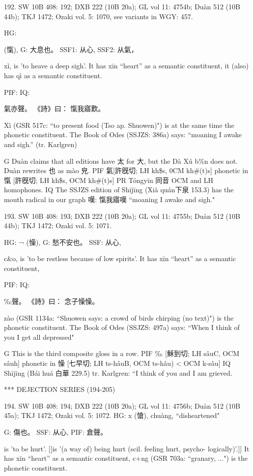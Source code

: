 192. SW 10B 408: 192; DXB 222 (10B 20a); GL vol 11: 4754b; Duàn 512 (10B 44b); TKJ 1472; Ozaki vol. 5: 1070, see
variants in WGY: 457.

HG:	{ (愾),
G:	大息也。
SSF1: 从心,
SSF2: 从氣，


xì,
is 'to heave a deep sigh'.
It has xīn ``heart'' as a semantic constituent, it (also) has qì as a semantic constituent.

PIF: IQ:

氣亦聲。
《詩》曰： 愾我寤歎。

Xì (GSR 517c: ``to present food (Tso ap. Shuowen)") is at the same time the phonetic constituent.
The Book of Odes (SSJZS: 386a) says: ``moaning I awake and sigh.'' (tr. Karlgren)

G	Duàn claims that all editions have 太 for 大, but the Dà Xú b\%n does not.
Duàn rewrites 也 as mào 皃.
PIF     氣[許旣切; LH kh\$s, 0CM kh\#(t)s] phonetic in 愾 [許旣切; LH kh\$s, OCM kh\#(t)s]
PR	Tóngyīn 同音 OCM and LH homophones.
IQ	The SSJZS edition of Shījīng (Xià quán下泉 153.3) has the mouth radical in our graph 嘆: 愾我寤嘆 ``moaning I awake and sigh."

193. SW 10B 408: 193; DXB 222 (10B 20a); GL vol 11: 4755b; Duàn 512 (10B 44b); TKJ 1472; Ozaki vol. 5: 1071.

HG: ¬ (懆),
G:	愁不安也。
SSF: 从心,


c&o,
is 'to be restless because of low spirits'.
It has xīn ``heart'' as a semantic constituent,

PIF: IQ:

‰聲。
《詩》曰： 念子懆懆。

zào (GSR 1134a: ``Shuowen says: a crowd of birds chirping (no text)") is the phonetic constituent.
The Book of Odes (SSJZS: 497a) says: ``When I think of you I get all depressed"

G	This is the third composite gloss in a row.
PIF     ‰ [穌到切; LH sâuC, OCM sâuh] phonetic in 懆 [七早切; LH ts-hâuB, OCM ts-hâu) < OCM k-sâu]
IQ	Shījīng (Bái huá 白華 229.5) tr. Karlgren: ``I think of you and I am grieved.



***
DEJECTION SERIES (194-205)

194. SW 10B 408: 194; DXB 222 (10B 20a); GL vol 11: 4756b; Duàn 512 (10B 45a); TKJ 1472; Ozaki vol. 5: 1072.
HG:  x (愴), chuàng, ``disheartened"

G:	傷也。
SSF: 从心,
PIF: 倉聲。

is 'to be hurt'. [[is '(a way of) being hurt (scil. feeling hurt, psycho- logically)'.]]
It has xīn ``heart'' as a semantic constituent,
c+ng (GSR 703a: ``granary, ...") is the phonetic constituent.

}
